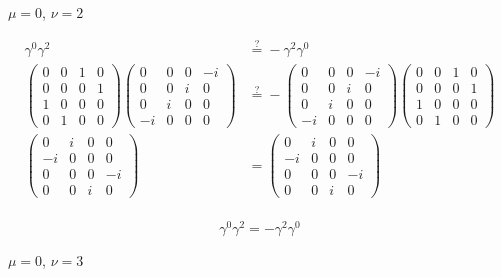 \documentclass[11pt]{article}
\theoremstyle{definition}
\begin{document}
$\mu = 0$, $\nu = 2$

\begin{align}
    \gamma^{0}\gamma^{2} &\stackrel{?}{=} -\gamma^{2}\gamma^{0}\\
    \begin{pmatrix}0&0&1&0\\     0&0&0&1\\     1&0&0&0\\     0&1&0&0\end{pmatrix}\begin{pmatrix}0&0&0&-i\\     0&0&i&0\\     0&i&0&0\\     -i&0&0&0\end{pmatrix} &\stackrel{?}{=}-\begin{pmatrix}0&0&0&-i\\       0&0&i&0\\      0&i&0&0\\       -i&0&0&0\end{pmatrix}\begin{pmatrix}0&0&1&0\\       0&0&0&1\\       1&0&0&0\\       0&1&0&0\end{pmatrix}\\
    \begin{pmatrix}0&i&0&0\\ -i&0&0&0\\ 0&0&0&-i\\ 0&0&i&0\end{pmatrix} &= \begin{pmatrix}0&i&0&0\\ -i&0&0&0\\ 0&0&0&-i\\ 0&0&i&0\end{pmatrix}\\
\end{align}

\begin{equation}
\boxed{
    \gamma^{0}\gamma^{2} = -\gamma^{2}\gamma^{0}
}
\end{equation}

$\mu = 0$, $\nu = 3$
\end{document}
